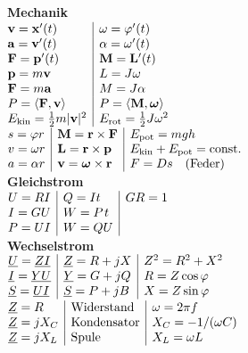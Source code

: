 \documentclass[a4paper,10pt,fleqn,twoside,twocolumn,dvipdfmx]{scrartcl}
\newcommand{\strong}[1]{\textsf{\textbf{#1}}}
\newcommand{\bvec}[1]{\mathbf{#1}}
\newcommand{\bvecgreek}[1]{\boldsymbol{#1}}
\begin{document}
\noindent\strong{Mechanik}\\
$\begin{array}{@{}l|l}
\bvec v = \bvec x'(t) & \omega = \varphi'(t)\\
\bvec a = \bvec v'(t) & \alpha = \omega'(t)\\
\bvec F = \bvec p'(t) & \bvec M = \bvec L'(t)\\
\bvec p = m\bvec v & L = J\omega\\
\bvec F = m\bvec a & M = J\alpha\\
P = \langle\bvec F,\bvec v\rangle & P = \langle\bvec M,\bvecgreek\omega\rangle\\
E_\mathrm{kin} = \frac{1}{2}m|\bvec v|^2
& E_\mathrm{rot} = \frac{1}{2}J\omega^2
\end{array}$\\[2pt]
$\begin{array}{@{}l|l|l}
s =\varphi r
& \bvec M = \bvec r\times\bvec F & E_\mathrm{pot} = mgh\\
v = \omega r
& \bvec L = \bvec r\times\bvec p
& E_\mathrm{kin}+E_\mathrm{pot} = \mathrm{const.}\\
a =\alpha r & \bvec v = \bvecgreek\omega\times\bvec r
& F = Ds\quad \mathrm{(Feder)}
\end{array}$\\[4pt]
\strong{Gleichstrom}\\
$\begin{array}{@{}l|l|l}
U = RI & Q = It & GR = 1\\
I = GU & W = P\;\!t\\
P = UI & W = QU\\
\end{array}$\\[4pt]
\strong{Wechselstrom}\\[2pt]
$\begin{array}{@{}l|l|l}
\underline U = \underline Z\underline I
& \underline Z = R+jX
& Z^2 = R^2+X^2\\
\underline I=\underline Y\underline U
& \underline Y = G+jQ
& R = Z\cos\varphi\\
\underline S = \underline U\underline I
& \underline S = P+jB
& X = Z\sin\varphi
\end{array}$\\[4pt]
$\begin{array}{@{}l|l|l}
\underline Z = R & \mathrm{Widerstand}
& \omega = 2\pi f\\
\underline Z = jX_C & \mathrm{Kondensator}
& X_C = -1/(\omega C)\\
\underline Z = jX_L & \mathrm{Spule}
& X_L = \omega L
\end{array}$\\[4pt]
\end{document}
